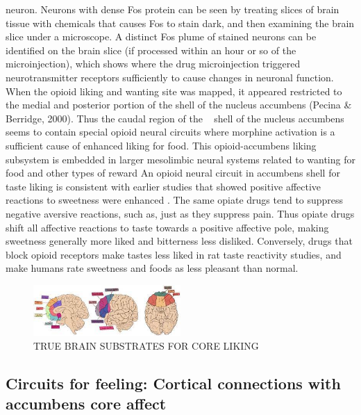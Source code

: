 \documentclass[conference]{IEEEtran}
\begin{document}
neuron. Neurons with dense Fos protein can be seen by
treating slices of brain tissue with chemicals that causes
Fos to stain dark, and then examining the brain slice
under a microscope. A distinct Fos plume of stained
neurons can be identified on the brain slice (if processed
within an hour or so of the microinjection), which shows
where the drug microinjection triggered neurotransmitter receptors sufficiently to cause changes in neuronal
function.
When the opioid liking and wanting site was
mapped, it appeared restricted to the medial and posterior portion of the shell of the nucleus accumbens
(Pecina & Berridge, 2000). Thus the caudal region of the ~
shell of the nucleus accumbens seems to contain special
opioid neural circuits where morphine activation is a
sufficient cause of enhanced liking for food. This opioid-accumbens liking subsystem is embedded in larger
mesolimbic neural systems related to wanting for food
and other types of reward 
An opioid neural circuit in accumbens shell for taste
liking is consistent with earlier studies that showed
positive affective reactions to sweetness were enhanced
. The same opiate drugs tend to suppress
negative aversive reactions, such as, just as they suppress pain. Thus
opiate drugs shift all affective reactions to taste towards
a positive affective pole, making sweetness generally
more liked and bitterness less disliked. Conversely,
drugs that block opioid receptors make tastes less liked
in rat taste reactivity studies, and make humans rate sweetness and foods as less pleasant than normal.
\begin{figure}[h]
  \centering
  \includegraphics[width=0.5\textwidth]{pic-4.jpeg}
  \caption{TRUE BRAIN SUBSTRATES FOR CORE LIKING}
  \label{fig:example}
\end{figure}


\subsection{Circuits for feeling: Cortical connections with
accumbens core affect}
\end{document}
